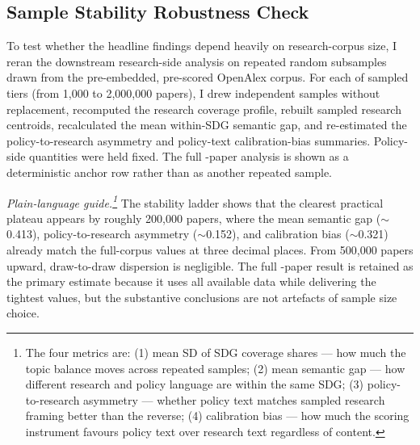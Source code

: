 \documentclass[12pt,a4paper]{article}
\begin{document}
\subsection{Sample Stability Robustness Check}

To test whether the headline findings depend heavily on research-corpus size, I reran the downstream research-side analysis on repeated random subsamples drawn from the pre-embedded, pre-scored OpenAlex corpus. For each of \SampleStabilitySampledTierCount{} sampled tiers (from 1{,}000 to 2{,}000{,}000 papers), I drew \SampleStabilityDraws{} independent samples without replacement, recomputed the research coverage profile, rebuilt sampled research centroids, recalculated the mean within-SDG semantic gap, and re-estimated the policy-to-research asymmetry and policy-text calibration-bias summaries. Policy-side quantities were held fixed. The full \SampleStabilityFullCorpusN{}-paper analysis is shown as a deterministic anchor row rather than as another repeated sample.

\begin{table}[ht]
\centering
\caption{Sample-stability ladder for the research corpus. Mean SD of SDG coverage shares is the unweighted mean of the per-SDG standard deviations in research coverage share across the \SampleStabilityDraws{} random draws at each sampled tier. The remaining columns report the mean and draw-to-draw standard deviation of the headline downstream metrics. The full-corpus row is deterministic and therefore has no variance term.}
\label{tab:sample-stability}
\resizebox{\textwidth}{!}{%

}
\end{table}

\noindent\textit{Plain-language guide.\footnote{The four metrics are: (1) mean SD of SDG coverage shares --- how much the topic balance moves across repeated samples; (2) mean semantic gap --- how different research and policy language are within the same SDG; (3) policy-to-research asymmetry --- whether policy text matches sampled research framing better than the reverse; (4) calibration bias --- how much the scoring instrument favours policy text over research text regardless of content.}} The stability ladder shows that the clearest practical plateau appears by roughly 200{,}000 papers, where the mean semantic gap ($\sim$0.413), policy-to-research asymmetry ($\sim$0.152), and calibration bias ($\sim$0.321) already match the full-corpus values at three decimal places. From 500{,}000 papers upward, draw-to-draw dispersion is negligible. The full \SampleStabilityFullCorpusN{}-paper result is retained as the primary estimate because it uses all available data while delivering the tightest values, but the substantive conclusions are not artefacts of sample size choice.
\end{document}
